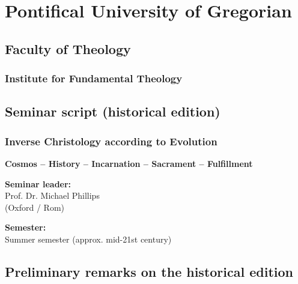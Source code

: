 \documentclass[
]{article}
\begin{document}
\section{\texorpdfstring{\textbf{Pontifical University of Gregorian}}{Pontifical University of Gregorian}}\label{pontifical-university-of-gregorian}

\subsection{\texorpdfstring{\textbf{Faculty of Theology}}{Faculty of Theology}}\label{faculty-of-theology}

\subsubsection{\texorpdfstring{\textbf{Institute for Fundamental Theology}}{Institute for Fundamental Theology}}\label{institute-for-fundamental-theology}

\subsection{\texorpdfstring{\textbf{Seminar script (historical edition)}}{Seminar script (historical edition)}}\label{seminar-script-historical-edition}

\subsubsection{\texorpdfstring{\textbf{Inverse Christology according to Evolution}}{Inverse Christology according to Evolution}}\label{inverse-christology-according-to-evolution}

\textbf{Cosmos -- History -- Incarnation -- Sacrament -- \hspace{0pt}\hspace{0pt}Fulfillment}

\textbf{Seminar leader:\\
}Prof. Dr. Michael Phillips\\
(Oxford / Rom)

\textbf{Semester:\\
}Summer semester (approx. mid-21st century)

\subsection{\texorpdfstring{\textbf{Preliminary remarks on the historical edition}}{Preliminary remarks on the historical edition}}\label{preliminary-remarks-on-the-historical-edition}
\end{document}
